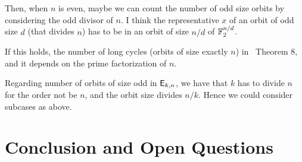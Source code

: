 \documentclass{llncs}
\begin{document}
Then, when $n$ is even, maybe we can count the number of odd size orbits by considering the odd divisor of $n$. I think the representative $x$ of an orbit of odd size $d$ (that divides $n$) has to be in an orbit of size $n/d$ of $\mathbb{F}_2^{n/d}$. 

If this holds, the number of long cycles (orbits of size exactly $n$) in~\cite{DAM:StaMai08} Theorem 8, and it depends on the prime factorization of $n$.




Regarding number of orbits of size odd in $\mathsf{E}_{k,n}$, we have that $k$ has to divide $n$ for the order not be $n$, and the orbit size divides $n/k$. Hence we could consider subcases as above.
































\section{Conclusion and Open Questions}









\ifnum{}
%


\else


\end{document}

